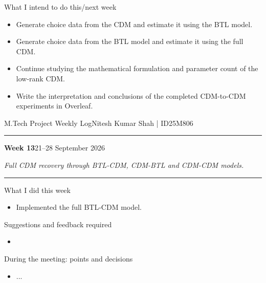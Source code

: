 \documentclass[10pt]{article}
\newcommand{\weekheading}[3]{%
  {\small M.Tech Project Weekly Log}\hfill{\small Nitesh Kumar Shah \;|\; ID25M806}\par
  \vspace{2pt}\hrule\vspace{7pt}
  {\Large\bfseries Week #1}\hfill{\normalsize #2}\par
  \vspace{2pt}
  {\itshape #3}\par
  \vspace{5pt}\hrule\vspace{7pt}
}
\begin{document}
\begin{weeklybox}{What I intend to do this/next week}

  \small

  \begin{itemize}

    \item Generate choice data from the CDM and estimate it using the
    BTL model.

    \item Generate choice data from the BTL model and estimate it using
    the full CDM.

    \item Continue studying the mathematical formulation and parameter
    count of the low-rank CDM.

    \item Write the interpretation and conclusions of the completed
    CDM-to-CDM experiments in Overleaf.

  \end{itemize}

\end{weeklybox}

\newpage

\weekheading{13}{21--28 September 2026}
{Full CDM recovery through BTL-CDM, CDM-BTL and CDM-CDM models.}

\begin{weeklybox}{What I did this week}

  \small

  \begin{itemize}
    
    \item
     Implemented the full BTL-CDM model.
  \end{itemize}

\end{weeklybox}

\begin{weeklybox}{Suggestions and feedback required}

  \small

  \begin{itemize}


    \item 

  \end{itemize}

\end{weeklybox}

\begin{weeklybox}{During the meeting: points and decisions}

  \small

  \begin{itemize}
    \item ...
 


  \end{itemize}

\end{weeklybox}
\end{document}

